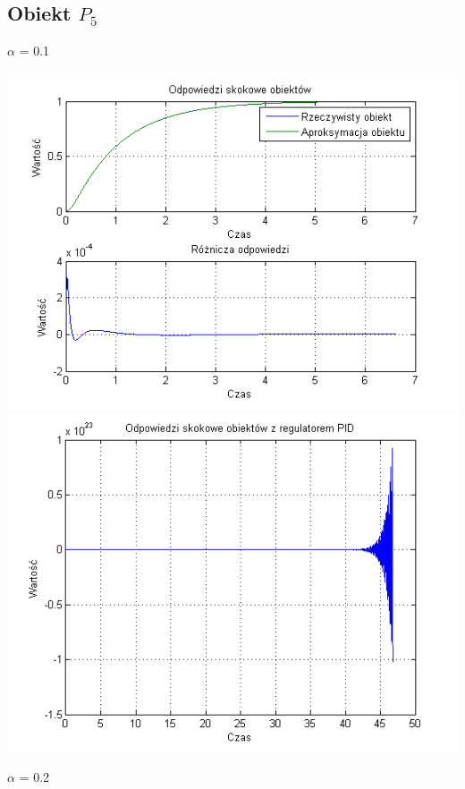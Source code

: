 \documentclass[10pt,a4paper]{article}
\begin{document}
\subsection{Obiekt $P_5$}
$\alpha$ = 0.1
\begin{center}
\includegraphics[scale=1]{images/dwa/skrypt_117.png}\\
\includegraphics[scale=1]{images/dwa/skrypt_118.png}\\
\end{center}
\newpage
$\alpha$ = 0.2
\end{document}
